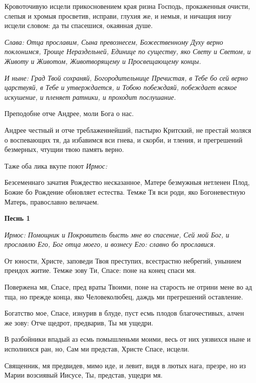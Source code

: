 Кровоточивую исцели прикосновением края ризна Господь, прокаженныя очисти, слепыя и хромыя просветив, исправи, глухия же, и немыя, и ничащия низу исцели словом: да ты спасешися, окаянная душе. 

\itshape Слава\normalfont{}: Отца прославим, Сына превознесем, Божественному Духу верно поклонимся, Троице Нераздельней, Единице по существу, яко Свету и Светом, и Животу и Животом, Животворящему и Просвещающему концы. 

\itshape И ныне\normalfont{}: Град Твой сохраняй, Богородительнице Пречистая, в Тебе бо сей верно царствуяй, в Тебе и утверждается, и Тобою побеждаяй, побеждает всякое искушение, и пленяет ратники, и проходит послушание. 

Преподобне отче Андрее, моли Бога о нас. 

Андрее честный и отче треблаженнейший, пастырю Критский, не престай моляся о воспевающих тя, да избавимся вси гнева, и скорби, и тления, и прегрешений безмерных, чтущии твою память верно. 

Таже оба лика вкупе поют \itshape Ирмос\normalfont{}: 

Безсеменнаго зачатия Рождество несказанное, Матере безмужныя нетленен Плод, Божие бо Рождение обновляет естества. Темже Тя вси роди, яко Богоневестную Матерь, православно величаем. 

\bigskip\bigskip\mychapterending

 
\bfseries Песнь 1\normalfont{}

\itshape Ирмос\normalfont{}: Помощник и Покровитель бысть мне во спасение, Сей мой Бог, и прославлю Его, Бог отца моего, и вознесу Его: славно бо прославися. 

От юности, Христе, заповеди Твоя преступих, всестрастно небрегий, унынием преидох житие. Темже зову Ти, Спасе: поне на конец спаси мя. 

Повержена мя, Спасе, пред враты Твоими, поне на старость не отрини мене во ад тща, но прежде конца, яко Человеколюбец, даждь ми прегрешений оставление. 

Богатство мое, Спасе, изнурив в блуде, пуст есмь плодов благочестивых, алчен же зову: Отче щедрот, предварив, Ты мя ущедри. 

В разбойники впадый аз есмь помышленьми моими, весь от них уязвихся ныне и исполнихся ран, но, Сам ми представ, Христе Спасе, исцели. 

Священник, мя предвидев, мимо иде, и левит, видя в лютых нага, презре, но из Марии возсиявый Иисусе, Ты, представ, ущедри мя. 

